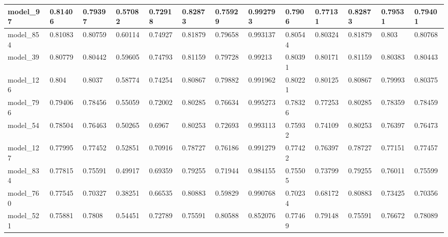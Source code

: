 \begin{tabular}{|l|l|l|l|l|l|l|l|l|l|l|l|l|}
model\_97      & 0.81406     & 0.79397        & 0.57082      & 0.72918          & 0.82873              & 0.75929              & 0.992793     & 0.7906            & 0.77131            & 0.82873         & 0.79531     & 0.79401      \\ \hline
model\_854     & 0.81083     & 0.80759        & 0.60114      & 0.74927          & 0.81879              & 0.79658              & 0.993137     & 0.80544           & 0.80324            & 0.81879         & 0.803       & 0.80768      \\ \hline
model\_39      & 0.80779     & 0.80442        & 0.59605      & 0.74793          & 0.81159              & 0.79728              & 0.99213      & 0.80391           & 0.80171            & 0.81159         & 0.80383     & 0.80443      \\ \hline
model\_126     & 0.804       & 0.8037         & 0.58774      & 0.74254          & 0.80867              & 0.79882              & 0.991962     & 0.80221           & 0.80125            & 0.80867         & 0.79993     & 0.80375      \\ \hline
model\_796     & 0.79406     & 0.78456        & 0.55059      & 0.72002          & 0.80285              & 0.76634              & 0.995273     & 0.78326           & 0.77253            & 0.80285         & 0.78359     & 0.78459      \\ \hline
model\_54      & 0.78504     & 0.76463        & 0.50265      & 0.6967           & 0.80253              & 0.72693              & 0.993113     & 0.75932           & 0.74109            & 0.80253         & 0.76397     & 0.76473      \\ \hline
model\_127     & 0.77995     & 0.77452        & 0.52851      & 0.70916          & 0.78727              & 0.76186              & 0.991279     & 0.77422           & 0.76397            & 0.78727         & 0.77151     & 0.77457      \\ \hline
model\_834     & 0.77815     & 0.75591        & 0.49917      & 0.69359          & 0.79255              & 0.71944              & 0.984155     & 0.75505           & 0.73799            & 0.79255         & 0.76011     & 0.75599      \\ \hline
model\_760     & 0.77545     & 0.70327        & 0.38251      & 0.66535          & 0.80883              & 0.59829              & 0.990768     & 0.70234           & 0.68172            & 0.80883         & 0.73425     & 0.70356      \\ \hline
model\_521     & 0.75881     & 0.7808         & 0.54451      & 0.72789          & 0.75591              & 0.80588              & 0.852076     & 0.77469           & 0.79148            & 0.75591         & 0.76672     & 0.78089      \\ \hline

\end{tabular}
